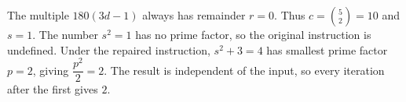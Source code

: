 The multiple $180(3d-1)$ always has remainder $r=0$. Thus $c=\binom52=10$ and $s=1$. The number $s^2=1$ has no prime factor, so the original instruction is undefined. Under the repaired instruction, $s^2+3=4$ has smallest prime factor $p=2$, giving $\dfrac{p^2}{2}=2$. The result is independent of the input, so every iteration after the first gives $\boxed2$.
